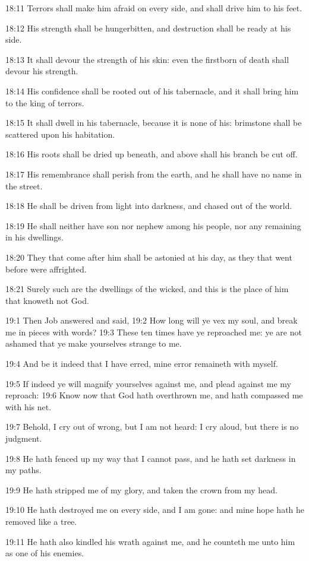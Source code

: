 18:11 Terrors shall make him afraid on every side, and shall drive him to his feet.

18:12 His strength shall be hungerbitten, and destruction shall be ready at his side.

18:13 It shall devour the strength of his skin: even the firstborn of death shall devour his strength.

18:14 His confidence shall be rooted out of his tabernacle, and it shall bring him to the king of terrors.

18:15 It shall dwell in his tabernacle, because it is none of his: brimstone shall be scattered upon his habitation.

18:16 His roots shall be dried up beneath, and above shall his branch be cut off.

18:17 His remembrance shall perish from the earth, and he shall have no name in the street.

18:18 He shall be driven from light into darkness, and chased out of the world.

18:19 He shall neither have son nor nephew among his people, nor any remaining in his dwellings.

18:20 They that come after him shall be astonied at his day, as they that went before were affrighted.

18:21 Surely such are the dwellings of the wicked, and this is the place of him that knoweth not God.

19:1 Then Job answered and said, 19:2 How long will ye vex my soul, and break me in pieces with words?  19:3 These ten times have ye reproached me: ye are not ashamed that ye make yourselves strange to me.

19:4 And be it indeed that I have erred, mine error remaineth with myself.

19:5 If indeed ye will magnify yourselves against me, and plead against me my reproach: 19:6 Know now that God hath overthrown me, and hath compassed me with his net.

19:7 Behold, I cry out of wrong, but I am not heard: I cry aloud, but there is no judgment.

19:8 He hath fenced up my way that I cannot pass, and he hath set darkness in my paths.

19:9 He hath stripped me of my glory, and taken the crown from my head.

19:10 He hath destroyed me on every side, and I am gone: and mine hope hath he removed like a tree.

19:11 He hath also kindled his wrath against me, and he counteth me unto him as one of his enemies.

